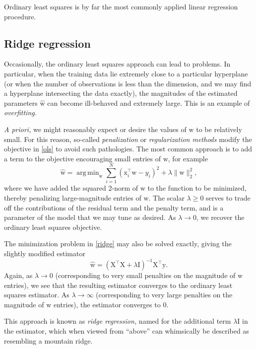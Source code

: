 \documentclass{article}
\newcommand{\inv}{^{-1}}
\newcommand{\trans}{^\top}
\newcommand{\mat}[1]{\bm{\mathrm{#1}}}
\renewcommand{\vec}[1]{\bm{\mathrm{#1}}}
\DeclareMathOperator*{\argmin}{arg\,min}
\begin{document}
Ordinary least squares is by far the most commonly applied linear
regression procedure.

\subsection*{Ridge regression}

Occasionally, the ordinary least squares approach can lead to
problems.  In particular, when the training data lie extremely close
to a particular hyperplane (or when the number of observations is less
than the dimension, and we may find a hyperplane intersecting the data
exactly), the magnitudes of the estimated parameters $\hat{\vec{w}}$
can become ill-behaved and extremely large.  This is an example of
\emph{overfitting.}

\emph{A priori,} we might reasonably expect or desire the values of
$\vec{w}$ to be relatively small.  For this reason, so-called
\emph{penalization} or \emph{regularization methods} modify the
objective in \eqref{ols} to avoid such pathologies.  The most common
approach is to add a term to the objective encouraging small entries
of $\vec{w}$, for example
\begin{equation}
  \label{ridge}
  \hat{\vec{w}}
  =
  \argmin_{\vec{w}}
  \sum_{i = 1}^N
  (\vec{x}_i\trans \vec{w} - y_i)^2
  +
  \lambda
  \lVert \vec{w} \rVert_{2}^2,
\end{equation}
where we have added the squared 2-norm of $\vec{w}$ to the function to
be minimized, thereby penalizing large-magnitude entries of $\vec{w}$.
The scalar $\lambda \geq 0$ serves to trade off the contributions of
the residual term and the penalty term, and is a parameter of the
model that we may tune as desired.  As $\lambda \to 0$, we recover the
ordinary least squares objective.

The minimization problem in \eqref{ridge} may also be solved exactly,
giving the slightly modified estimator
\begin{equation*}
  \hat{\vec{w}}
  =
  (\mat{X}\trans\mat{X} + \lambda \mat{I})\inv \mat{X}\trans \vec{y}.
\end{equation*}
Again, as $\lambda \to 0$ (corresponding to very small penalties on
the magnitude of $\vec{w}$ entries), we see that the resulting
estimator converges to the ordinary least squares estimator.  As
$\lambda \to \infty$ (corresponding to very large penalties on the
magnitude of $\vec{w}$ entries), the estimator converges to $\vec{0}$.

This approach is known as \emph{ridge regression,} named for the
additional term $\lambda \mat{I}$ in the estimator, which when viewed
from ``above'' can whimsically be described as resembling a mountain
ridge.
\end{document}
